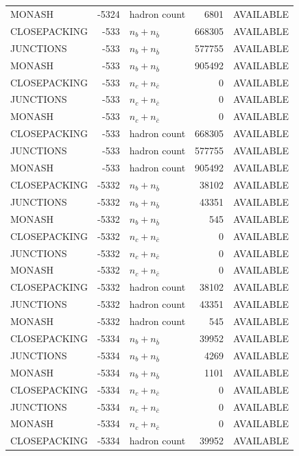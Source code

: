 \begin{landscape}
\begin{longtable}{@{}lrlrl@{}}
MONASH & -5324 & hadron count & \num{6801} & AVAILABLE \\
CLOSEPACKING & -533 & $n_b+n_{\bar b}$ & \num{668305} & AVAILABLE \\
JUNCTIONS & -533 & $n_b+n_{\bar b}$ & \num{577755} & AVAILABLE \\
MONASH & -533 & $n_b+n_{\bar b}$ & \num{905492} & AVAILABLE \\
CLOSEPACKING & -533 & $n_c+n_{\bar c}$ & \num{0} & AVAILABLE \\
JUNCTIONS & -533 & $n_c+n_{\bar c}$ & \num{0} & AVAILABLE \\
MONASH & -533 & $n_c+n_{\bar c}$ & \num{0} & AVAILABLE \\
CLOSEPACKING & -533 & hadron count & \num{668305} & AVAILABLE \\
JUNCTIONS & -533 & hadron count & \num{577755} & AVAILABLE \\
MONASH & -533 & hadron count & \num{905492} & AVAILABLE \\
CLOSEPACKING & -5332 & $n_b+n_{\bar b}$ & \num{38102} & AVAILABLE \\
JUNCTIONS & -5332 & $n_b+n_{\bar b}$ & \num{43351} & AVAILABLE \\
MONASH & -5332 & $n_b+n_{\bar b}$ & \num{545} & AVAILABLE \\
CLOSEPACKING & -5332 & $n_c+n_{\bar c}$ & \num{0} & AVAILABLE \\
JUNCTIONS & -5332 & $n_c+n_{\bar c}$ & \num{0} & AVAILABLE \\
MONASH & -5332 & $n_c+n_{\bar c}$ & \num{0} & AVAILABLE \\
CLOSEPACKING & -5332 & hadron count & \num{38102} & AVAILABLE \\
JUNCTIONS & -5332 & hadron count & \num{43351} & AVAILABLE \\
MONASH & -5332 & hadron count & \num{545} & AVAILABLE \\
CLOSEPACKING & -5334 & $n_b+n_{\bar b}$ & \num{39952} & AVAILABLE \\
JUNCTIONS & -5334 & $n_b+n_{\bar b}$ & \num{4269} & AVAILABLE \\
MONASH & -5334 & $n_b+n_{\bar b}$ & \num{1101} & AVAILABLE \\
CLOSEPACKING & -5334 & $n_c+n_{\bar c}$ & \num{0} & AVAILABLE \\
JUNCTIONS & -5334 & $n_c+n_{\bar c}$ & \num{0} & AVAILABLE \\
MONASH & -5334 & $n_c+n_{\bar c}$ & \num{0} & AVAILABLE \\
CLOSEPACKING & -5334 & hadron count & \num{39952} & AVAILABLE \\

\end{longtable}
\end{landscape}

